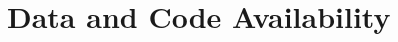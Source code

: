 \documentclass[11pt]{article}
\begin{document}
























\section{Data and Code Availability}

\end{document}
